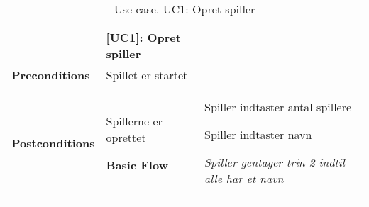\documentclass[class=article, crop=false]{standalone}
\makeatletter
\let\savespace\@minipagetrue
\makeatother
\begin{document}
    \begin{table}[H]
        \caption{Use case. UC1: Opret spiller}
        \begin{tabularx}{\textwidth}{|l|X|}
            \hline
            & \textbf{[UC1]: Opret spiller}   \\ \hline
            \textbf{Preconditions}       & Spillet er startet \\ \hline
            \textbf{Postconditions}      & Spillerne er oprettet\ \hline

            \textbf{Basic Flow} & \begin{tabenum}
                                      \item Spiller indtaster antal spillere
                                      \item Spiller indtaster navn
                                      \savespace
                                      \begin{compactitem}
                                          \item \textit{Spiller gentager trin 2 indtil alle har et navn}
                                      \end{compactitem}
            \end{tabenum}   \\ \hline

            \hline
        \end{tabularx}


    \end{table}
\end{document}
